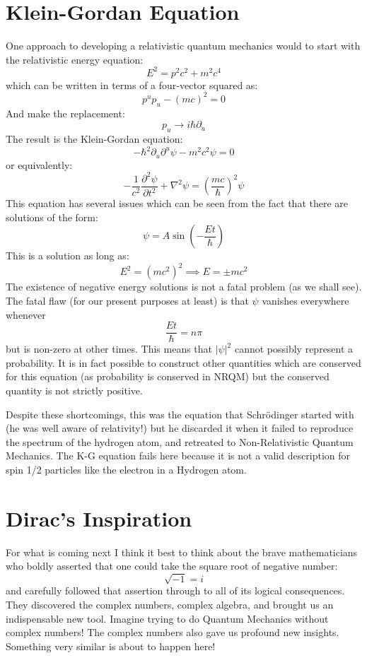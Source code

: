 \documentclass[12pt]{book}
\begin{document}
\section{Klein-Gordan Equation}
One approach to developing a relativistic quantum mechanics would 
to start with the relativistic energy equation:
$$E^2 = p^2c^2 + m^2c^4$$
which can be written in terms of a four-vector squared as:
$$p^u p_u - (mc)^2 = 0$$
And make the replacement:
$$p_u \to i \hbar \partial_u$$
The result is the Klein-Gordan equation:
$$-\hbar^2 \partial_u \partial^u \psi - m^2c^2 \psi = 0$$
or equivalently:
$$-\frac{1}{c^2} \frac{\partial^2 \psi}{\partial t^2} + \nabla^2 \psi = \left(\frac{mc}{\hbar}\right)^2 \psi$$
This equation has several issues which can be seen from the fact that there are solutions of the form:
$$\psi = A \sin\left(-\frac{E t}{\hbar}\right) $$
This is a solution as long as:
$$E^2 = (mc^2)^2 \implies E = \pm mc^2$$
The existence of negative energy solutions is not a fatal problem (as we shall see).  The fatal flaw (for our present purposes at least) is that $\psi$ vanishes everywhere whenever
$$\frac{E t}{\hbar} = n\pi$$
but is non-zero at other times.  This means that $|\psi|^2$ cannot possibly represent a probability.  It is in fact possible to construct other quantities which are conserved for this equation (as probability is conserved in NRQM) but the conserved quantity is not strictly positive.

Despite these shortcomings, this was the equation that Schr\"odinger started with (he was well aware of relativity!) but he discarded it when it failed to reproduce the spectrum of the hydrogen atom, and retreated to Non-Relativistic Quantum Mechanics.  The K-G equation fails here because it is not a valid description for spin 1/2 particles like the electron in a Hydrogen atom.

\section{Dirac's Inspiration}

For what is coming next I think it best to think about the brave mathematicians who boldly asserted that one could take the square root of negative number:
$$\sqrt{-1} = i$$
and carefully followed that assertion through to all of its logical consequences.  They discovered the complex numbers, complex algebra, and brought us an indispensable new tool.  Imagine trying to do Quantum Mechanics without complex numbers!  The complex numbers also gave us profound new insights.  Something very similar is about to happen here!
\end{document}

